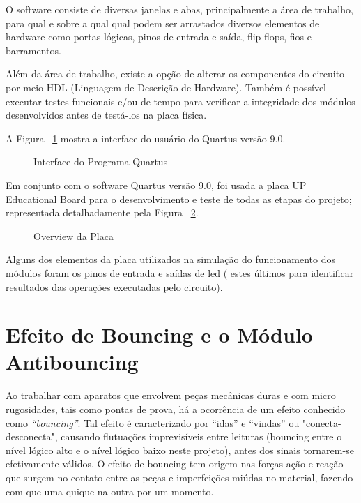 \documentclass[12pt,a4paper,openany]{abntex2}
\begin{document}
O software consiste de diversas janelas e abas, principalmente a área de trabalho, para qual e sobre a qual qual podem ser arrastados diversos elementos de hardware como portas lógicas, pinos de entrada e saída, flip-flops, fios e barramentos.

Além da área de trabalho, existe a opção de alterar os componentes do circuito por meio HDL (Linguagem de Descrição de Hardware). Também é possível executar testes funcionais e/ou de tempo para verificar a integridade dos módulos desenvolvidos antes de testá-los na placa física.

A Figura ~\ref{fig:interface-quartus} mostra a interface do usuário do Quartus versão 9.0.

\begin{figure}[!htp]
	\centering
	\caption{Interface do Programa Quartus}
	\label{fig:interface-quartus}
\end{figure}

Em conjunto com o software Quartus versão 9.0, foi usada a placa UP Educational Board para o desenvolvimento e teste de todas as etapas do projeto; representada detalhadamente pela Figura ~\ref{fig:placa-1}.

\begin{figure}[!htp]
	\centering
	\caption{Overview da Placa}
	\label{fig:placa-1}
\end{figure}

Alguns dos elementos da placa utilizados na simulação do funcionamento dos módulos foram os pinos de entrada e saídas de led ( estes últimos para identificar resultados das operações executadas pelo circuito).

\section{Efeito de Bouncing e o Módulo Antibouncing}

Ao trabalhar com aparatos que envolvem peças mecânicas duras e com micro rugosidades, tais como pontas de prova, há a ocorrência de um efeito conhecido como \textit{“bouncing”}. Tal efeito é caracterizado por “idas” e “vindas” ou "conecta-desconecta", causando flutuações imprevisíveis entre leituras (bouncing entre o nível lógico alto e o nível
lógico baixo neste projeto), antes dos sinais tornarem-se efetivamente válidos. O efeito de bouncing tem origem nas forças ação e reação que surgem no contato entre as peças e imperfeições miúdas no material, fazendo com que uma quique na outra por um momento.
\end{document}
